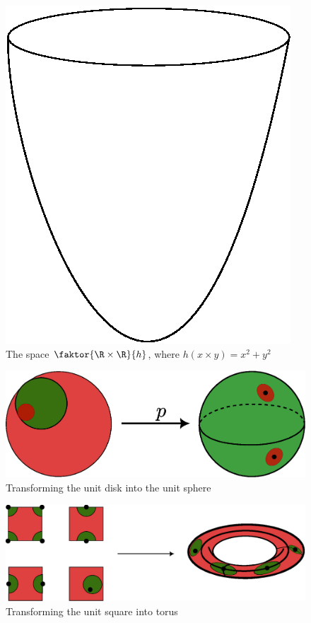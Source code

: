 \begin{example}
\begin{enumerate}
            \begin{figure}[h]
                \centering
                \includegraphics[scale=0.4]{Figures/chapter2/paraboloid_elliptic.eps}
                \caption{The space $\faktor{\R \times \R}{h}$, where $h(x \times
                y)=x^2+y^2$}
                \label{fig_2.6}
            \end{figure}
    \end{enumerate}
\end{example}

\begin{figure}[h]
    \centering
    \includegraphics[scale = 0.5]{Figures/chapter2/disk_to_sphere.eps}
    \caption{Transforming the unit disk into the unit sphere}
    \label{fig_2.4}
\end{figure}

\begin{figure}[h]
    \centering
    \includegraphics[scale = 0.5]{Figures/chapter2/square_to_torus_2.eps}
    \caption{Transforming the unit square into torus}
    \label{fig_2.4}
\end{figure}

